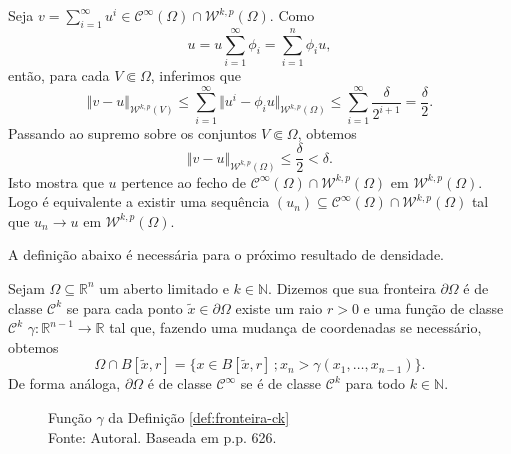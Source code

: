 \documentclass[a4paper, 11pt]{book}
\theoremstyle{definition}
\newcommand{\bN}{\mathbb{N}}
\newcommand{\bR}{\mathbb{R}}
\newcommand{\cC}{\mathcal{C}}
\newcommand{\cW}{\mathcal{W}}
\begin{document}
\begin{prf}
    Seja $v = \sum_{i=1}^\infty u^i \in \cC^{\infty}(\Omega) \cap \cW^{k,p}(\Omega)$.
    Como 
    \[
        u = u \sum_{i=1}^\infty \phi_i = \sum_{i=1}^n \phi_i u,
    \]
    então, para cada $V \Subset \Omega$, inferimos que
    \[
        \Vert v - u \Vert_{\cW^{k,p}(V)} \leqslant \sum_{i=1}^\infty \Vert u^i - \phi_i u \Vert_{\cW^{k,p}(\Omega)} \leqslant \sum_{i=1}^\infty \frac{\delta}{2^{i+1}} = \frac{\delta}{2}.
    \]
    Passando ao supremo sobre os conjuntos $V \Subset \Omega$, obtemos
    \[
        \Vert v - u \Vert_{\cW^{k,p}(\Omega)} \leqslant \frac{\delta}{2} < \delta.
    \]
    Isto mostra que $u$ pertence ao fecho de $\cC^\infty(\Omega) \cap \cW^{k,p}(\Omega)$ em $\cW^{k,p}(\Omega)$. Logo é equivalente a existir uma sequência $(u_n) \subseteq \cC^\infty(\Omega) \cap \cW^{k,p}(\Omega)$ tal que $u_n \to u$ em $\cW^{k,p}(\Omega)$.
\end{prf}

A definição abaixo é necessária para o próximo resultado de densidade.

\begin{dbox} \label{def:fronteira-ck}
    Sejam $\Omega \subseteq \bR^n$ um aberto limitado e $k \in \bN$. 
    Dizemos que sua fronteira $\partial \Omega$ é de classe $\cC^k$ se para cada ponto $\tilde x \in \partial \Omega$ existe um raio $r > 0$ e uma função de classe $\cC^k$ $\gamma : \bR^{n-1} \to \bR$ tal que, fazendo uma mudança de coordenadas se necessário, obtemos
    \[
        \Omega \cap B[\tilde x,r] = \{x \in B[\tilde x,r] \,; x_n > \gamma(x_1,\dots,x_{n-1})\}.
    \]
    De forma análoga, $\partial\Omega$ é de classe $\cC^\infty$ se é de classe $\cC^k$ para todo $k \in \bN$.
\end{dbox}

\begin{figure}
    \centering
    \caption{Função $\gamma$ da Definição \ref{def:fronteira-ck}\\
    Fonte: Autoral. Baseada em \cite{evans-pde} p.p. 626.}
\end{figure}
\end{document}
